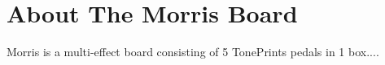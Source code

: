 \chapter{About The Morris Board}
\label{Morris}

Morris is a multi-effect board consisting of 5 TonePrints pedals in 1 box....